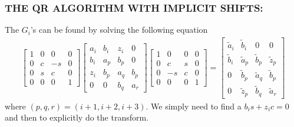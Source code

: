\documentclass[a4paper,8pt]{beamer} %
\newcommand{\smatrix}[1]{\left[\begin{matrix} #1 \end{matrix}\right]}
\begin{document}
\begin{frame} \frametitle{THE QR ALGORITHM WITH IMPLICIT SHIFTS:} %
		The $G_i$'s can be found by solving the following equation
		\begin{align}
			\smatrix{
				1 & 0 & 0 & 0 \\
				0 & c & -s & 0 \\
				0 & s & c & 0 \\
				0 & 0 & 0 & 1 
			}
			\smatrix{
				a_i& b_i & z_i & 0 \\
				b_i & a_p & b_p & 0 \\
				z_i & b_p & a_q & b_p \\
				0 & 0 & b_q & a_r 
			}
			\smatrix{
				1 & 0 & 0 & 0 \\
				0 & c & s & 0 \\
				0 & -s & c & 0 \\
				0 & 0 & 0 & 1 
			}
			=
			\smatrix{
				\tilde a_i& \tilde b_i & 0 & 0 \\
				\tilde b_i &\tilde a_p &\tilde b_p &\tilde z_p \\
				0 &\tilde b_p &\tilde a_q &\tilde b_p \\
				0 &\tilde z_p &\tilde b_q &\tilde a_r 
			}
		\end{align}
		where $(p,q,r)=(i+1, i+2, i+3)$. We simply need to find a $b_is+z_ic = 0$
		and then to explicitly do the transform. 
	\end{frame}%
\end{document}
